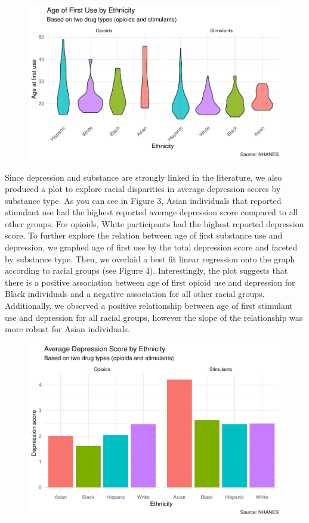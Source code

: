 \documentclass[man]{apa6}
\begin{document}
\begin{figure}
\centering
\includegraphics{Final_Paper_Group_3_files/figure-latex/ST_fig2-1.pdf}
\caption{}
\end{figure}

Since depression and substance are strongly linked in the literature, we
also produced a plot to explore racial disparities in average depression
scores by substance type. As you can see in Figure 3, Asian individuals
that reported stimulant use had the highest reported average depression
score compared to all other groups. For opioids, White participants had
the highest reported depression score. To further explore the relation
between age of first substance use and depression, we graphed age of
first use by the total depression score and faceted by substance type.
Then, we overlaid a best fit linear regression onto the graph according
to racial groups (see Figure 4). Interestingly, the plot suggests that
there is a positive association between age of first opioid use and
depression for Black individuals and a negative association for all
other racial groups. Additionally, we observed a positive relationship
between age of first stimulant use and depression for all racial groups,
however the slope of the relationship was more robust for Asian
individuals.

\begin{figure}
\centering
\includegraphics{Final_Paper_Group_3_files/figure-latex/ST_fig3-1.pdf}
\caption{}
\end{figure}
\end{document}

